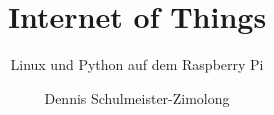 \title{Internet of Things}
\subtitle{Linux und Python auf dem Raspberry Pi}
\author{Dennis Schulmeister-Zimolong}

\renewcommand{\ubInstitute}{Studiengang Mechatronik}
\renewcommand{\ubModule}{Internet of Things}
\renewcommand{\ubType}{Aufgaben}
